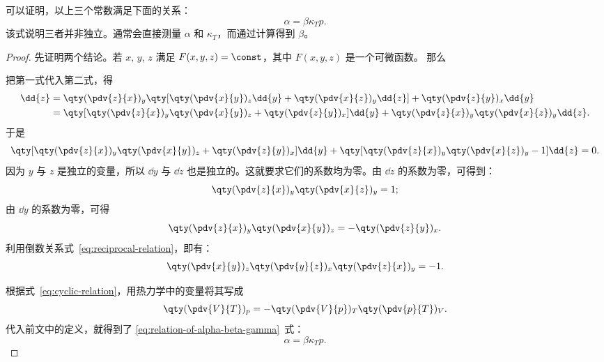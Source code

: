可以证明，以上三个常数满足下面的关系：
\begin{equation} \label{eq:relation-of-alpha-beta-gamma}
  \alpha = \beta \kappa_T p.
\end{equation}
该式说明三者并非独立。通常会直接测量 $\alpha$ 和 $\kappa_T$，而通过计算得到 $\beta$。

\begin{proof}
  先证明两个结论。若 $x, \, y, \, z$ 满足 $F(x, y, z) = \const$，其中 $F(x, y, z)$ 是一个可微函数。
  那么
  把第一式代入第二式，得
  \begin{align}
    \dd{z} &= \qty(\pdv{z}{x})_y
      \qty[\qty(\pdv{x}{y})_z \dd{y} + \qty(\pdv{x}{z})_y \dd{z}]
      + \qty(\pdv{z}{y})_x \dd{y} \notag \\
    &= \qty[\qty(\pdv{z}{x})_y \qty(\pdv{x}{y})_z + \qty(\pdv{z}{y})_x] \dd{y}
      + \qty(\pdv{z}{x})_y \qty(\pdv{x}{z})_y \dd{z}.
  \end{align}
  于是
  \begin{equation} \label{eq:coefficient-of-dy-and-dz}
    \qty[\qty(\pdv{z}{x})_y \qty(\pdv{x}{y})_z + \qty(\pdv{z}{y})_x] \dd{y}
    + \qty[\qty(\pdv{z}{x})_y \qty(\pdv{x}{z})_y - 1] \dd{z} = 0.
  \end{equation}
  因为 $y$ 与 $z$ 是独立的变量，所以 $\dd{y}$ 与 $\dd{z}$ 也是独立的。这就要求它们的系数均为零。由
  $\dd{z}$ 的系数为零，可得到：
  \begin{equation} \label{eq:reciprocal-relation}
    \qty(\pdv{z}{x})_y \qty(\pdv{x}{z})_y = 1;
  \end{equation}
  由 $\dd{y}$ 的系数为零，可得
  \begin{equation} \label{eq:cyclic-relation}
    \qty(\pdv{z}{x})_y \qty(\pdv{x}{y})_z = -\qty(\pdv{z}{y})_x.
  \end{equation}
  利用倒数关系式~\eqref{eq:reciprocal-relation}，即有：
  \begin{equation}
    \qty(\pdv{x}{y})_z \qty(\pdv{y}{z})_x \qty(\pdv{z}{x})_y = -1.
  \end{equation}

  根据式~\eqref{eq:cyclic-relation}，用热力学中的变量将其写成
  \begin{equation}
    \qty(\pdv{V}{T})_p = -\qty(\pdv{V}{p})_T \qty(\pdv{p}{T})_V.
  \end{equation}
  代入前文中的定义，就得到了 \eqref{eq:relation-of-alpha-beta-gamma}~式：
  \begin{equation}
    \alpha = \beta \kappa_T p.
  \end{equation}
\end{proof}

